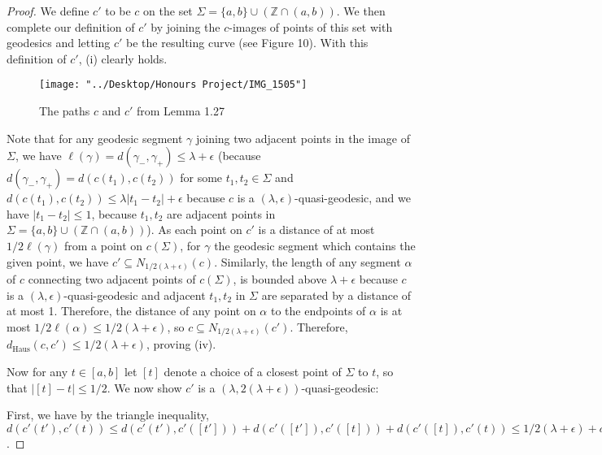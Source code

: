 \documentclass[12pt]{article}
\newcommand{\vs}{\vskip10pt}
\begin{document}
	\begin{proof}
		
		We define $c'$ to be $c$ on the set $\Sigma = \{a,b\} \cup (\mathbb{Z} \cap (a,b))$. We then complete our definition of $c'$ by joining the $c$-images of points of this set with geodesics and letting $c'$ be the resulting curve (see Figure 10). With this definition of $c'$, (i) clearly holds. 
		
\begin{figure} [H]
	\centering
	\texttt{[image: "../Desktop/Honours Project/IMG\_1505"]}
	\caption{The paths $c$ and $c'$ from Lemma 1.27}
	\label{fig:img1505}
\end{figure}
		
		\vs
		
		Note that for any geodesic segment $\gamma$ joining two adjacent points in the image of $\Sigma$, we have $\ell(\gamma) = d(\gamma_{-}, \gamma_{+}) \leq \lambda + \epsilon$ (because $d(\gamma_{-}, \gamma_{+}) = d(c(t_1), c(t_2))$ for some $t_1, t_2 \in \Sigma$ and $d(c(t_1), c(t_2)) \leq \lambda \vert t_1 - t_2 \vert + \epsilon$ because $c$ is a $(\lambda, \epsilon)$-quasi-geodesic, and we have $\vert t_1 - t_2 \vert \leq 1$, because $t_1, t_2$ are adjacent points in $\Sigma = \{a,b\} \cup (\mathbb{Z} \cap (a,b))$). As each point on $c'$ is a distance of at most $1/2 \ell(\gamma)$ from a point on $c(\Sigma)$, for $\gamma$ the geodesic segment which contains the given point, we have $c' \subseteq N_{1/2 (\lambda + \epsilon)} (c)$. Similarly, the length of any segment $\alpha$ of $c$ connecting two adjacent points of $c(\Sigma)$, is bounded above $\lambda + \epsilon$ because $c$ is a $(\lambda, \epsilon)$-quasi-geodesic and adjacent $t_1, t_2$ in $\Sigma$ are separated by a distance of at most 1. Therefore, the distance of any point on $\alpha$ to the endpoints of $\alpha$ is at most $1/2 \ell(\alpha) \leq 1/2 (\lambda + \epsilon)$, so $c \subseteq N_{1/2 (\lambda + \epsilon)} (c')$. Therefore, $d_{\text{Haus}}(c, c') \leq 1/2 (\lambda + \epsilon)$, proving (iv). 
		
		\vs 
		
		Now for any $t \in [a,b]$ let $[t]$ denote a choice of a closest point of $\Sigma$ to $t$, so that $\vert [t] - t \vert \leq 1/2$. We now show $c'$ is a $(\lambda, 2(\lambda + \epsilon))$-quasi-geodesic: 
		
		\vs 
		
		First, we have by the triangle inequality, $d(c'(t'), c'(t)) \leq d(c'(t'), c'([t'])) + d(c'([t']), c'([t])) + d(c'([t]), c'(t)) \leq 1/2 (\lambda + \epsilon) + d(c'([t']), c'([t])) + 1/2 (\lambda + \epsilon) = d(c'([t']), c'([t])) + \lambda + \epsilon$. 
		

\end{proof}
\end{document}
